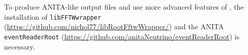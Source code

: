 To produce ANITA-like output files and use more advanced features of \icemc, the installation of \texttt{libFFTWwrapper} (\url{https://github.com/nichol77/libRootFftwWrapper/}) and the ANITA \texttt{eventReaderRoot} (\url{https://github.com/anitaNeutrino/eventReaderRoot}) is necessary. 



